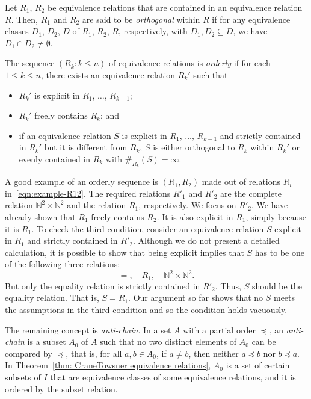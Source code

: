 \documentclass[AHL,Unicode,longabstracts,published]{cedram}
\newcommand*\N{\mathbb{N}}
\newcommand*\N{\mathbb{N}}
\begin{document}
\begin{defi}\label{def: orthogonal}
Let $R_1$, $R_2$ be equivalence relations that are contained in an equivalence relation $R$. Then, $R_1$ and $R_2$ are said to be \emph{orthogonal} within $R$ if for any equivalence classes $D_1$, $D_2$, $D$ of $R_1$, $R_2$, $R$, respectively, with $D_1, D_2 \subseteq D$, we have $D_1 \cap D_2 \neq \emptyset$.
\end{defi}
\goodbreak
\begin{defi}\label{def: orderly}
The sequence $(R_k : k \leq n)$ of equivalence relations is \emph{orderly} if for each $1\leq k \leq n$, there exists an equivalence relation $R_k'$ such that
\begin{itemize}
\item $R_k'$ is explicit in $R_1,\,\ldots,\,R_{k-1}$;
\item $R_k'$ freely contains $R_k$; and
\item if an equivalence relation $S$ is explicit in $R_1,\,\ldots,\,R_{k-1}$ and strictly contained in $R_k'$ but it is different from $R_k$, $S$ is either orthogonal to $R_k$ within $R_k'$ or evenly contained in $R_k$ with $\#_{R_k}(S) = \infty$.
\end{itemize}
\end{defi}

A good example of an orderly sequence is $(R_1,R_2)$ made out of relations $R_i$ in~\eqref{eqn:example-R12}. The required relations $R'_1$ and $R'_2$ are the complete relation $\mathbb{N}^2 \times \mathbb{N}^2$ and the relation $R_1$, respectively. We focus on $R'_2$. We have already shown that $R_1$ freely contains $R_2$. It is also explicit in $R_1$, simply because it is $R_1$. To check the third condition, consider an equivalence relation $S$ explicit in $R_1$ and strictly contained in $R'_2$. Although we do not present a detailed calculation, it is possible to show that being explicit implies that $S$ has to be one of the following three relations:
\[
=,\quad R_1,\quad
\N^2 \times \N^2.
\]
But only the equality relation is strictly contained in $R'_2$. Thus, $S$ should be the equality relation. That is, $S = R_1$. Our argument so far shows that no $S$ meets the assumptions in the third condition and so the condition holds vacuously.


The remaining concept is \emph{anti-chain}. In a set $A$ with a partial order $\preceq$, an \emph{anti-chain} is a subset $A_0$ of $A$ such that no two distinct elements of $A_0$ can be compared by $\preceq$, that is, for all $a,b \in A_0$, if $a \neq b$, then neither $a\preceq b$ nor $b \preceq a$. In Theorem~\ref{thm: CraneTowsner equivalence relations}, $A_0$ is a set of certain subsets of $I$ that are equivalence classes of some equivalence relations, and it is ordered by the subset relation.
\end{document}
